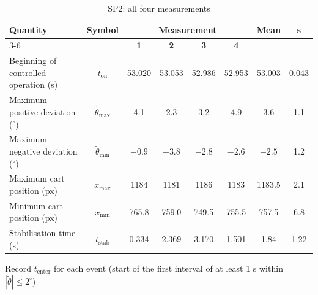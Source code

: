 \documentclass[11pt,a4paper]{article}
\begin{document}
\begin{table}[H]
    \centering
    \caption{SP2: all four measurements}
    \label{tab:sp2_all}
    \renewcommand{\arraystretch}{1.6}
    \begin{tabular}{|l|c|c|c|c|c|c|c|}
        \hline
        \textbf{Quantity} & \textbf{Symbol} & \multicolumn{4}{c|}{\textbf{Measurement}} & \textbf{Mean} & \textbf{s} \\
        \cline{3-6}
         & & \textbf{1} & \textbf{2} & \textbf{3} & \textbf{4} & & \\
        \hline
        Beginning of controlled operation (s) & $t_\text{on}$               & 53.020 & 53.053 & 52.986 & 52.953 & 53.003 & 0.043 \\ \hline
        Maximum positive deviation ($^\circ$) & $\tilde{\theta}_\text{max}$ & 4.1    & 2.3    & 3.2    & 4.9    & 3.6    & 1.1   \\ \hline
        Maximum negative deviation ($^\circ$) & $\tilde{\theta}_\text{min}$ & $-0.9$ & $-3.8$ & $-2.8$ & $-2.6$ & $-2.5$ & 1.2   \\ \hline
        Maximum cart position (px)            & $x_\text{max}$              & 1184   & 1181   & 1186   & 1183   & 1183.5 & 2.1   \\ \hline
        Minimum cart position (px)            & $x_\text{min}$              & 765.8  & 759.0  & 749.5  & 755.5  & 757.5  & 6.8   \\ \hline
        Stabilisation time (s)                & $t_\text{stab}$             & 0.334  & 2.369  & 3.170  & 1.501  & 1.84   & 1.22  \\ \hline
    \end{tabular}
\end{table}



Record $t_\text{enter}$ for each event (start of the first interval of at least 1 s within $|\tilde{\theta}| \le 2^\circ$)\newline

\newcommand{\uth}{\,?\,}  %
\newcommand{\ux}{\,?\,}   %

\newcommand{\uth}{\,?\,}  %
\newcommand{\ux}{\,?\,}   %
\end{document}
